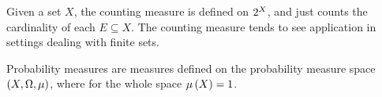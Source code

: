 \begin{example}
  Given a set \(X\),
  the counting measure is defined on \(2^{X}\),
  and just counts the cardinality of each \(E \subseteq X\).
  The counting measure tends to see application in settings
  dealing with finite sets.
\end{example}

\begin{example}
  Probability measures are measures
  defined on the probability measure space
  \(\left(X, \Omega, \mu\right)\),
  where for the whole space \(\mu\left(X\right) = 1\).
\end{example}


